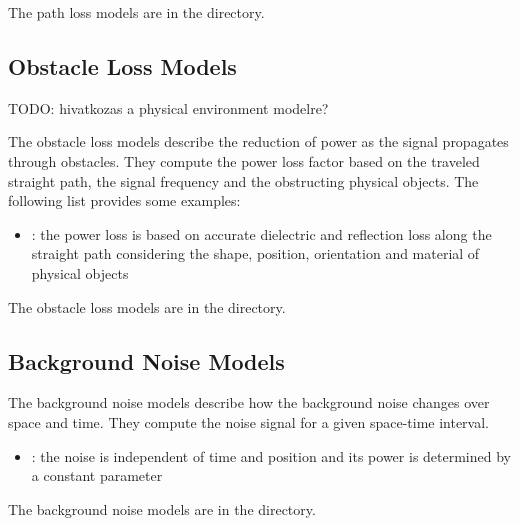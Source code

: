 The path loss models are in the  directory.

\subsection{Obstacle Loss Models}

TODO: hivatkozas a physical environment modelre?

The obstacle loss models describe the reduction of power as the signal propagates
through obstacles. They compute the power loss factor based on the traveled straight
path, the signal frequency and the obstructing physical objects. The following list
provides some examples:

\begin{itemize}
  \item {}: the power loss is based on accurate
dielectric and reflection loss along the straight path considering the shape,
position, orientation and material of physical objects
\end{itemize}

The obstacle loss models are in the  directory.

\subsection{Background Noise Models}

The background noise models describe how the background noise changes over space
and time. They compute the noise signal for a given space-time interval.

\begin{itemize}
  \item {}: the noise is independent of time and
position and its power is determined by a constant parameter 
\end{itemize}

The background noise models are in the 
directory.

